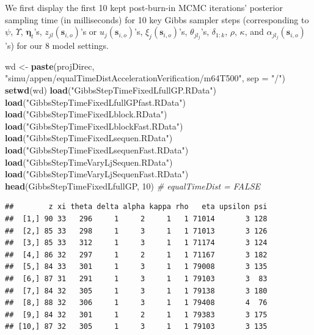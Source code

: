 \documentclass[
]{article}
\newenvironment{Shaded}{\begin{snugshade}}{\end{snugshade}}
\newcommand{\AttributeTok}[1]{\textcolor[rgb]{0.13,0.29,0.53}{#1}}
\newcommand{\CommentTok}[1]{\textcolor[rgb]{0.56,0.35,0.01}{\textit{#1}}}
\newcommand{\DecValTok}[1]{\textcolor[rgb]{0.00,0.00,0.81}{#1}}
\newcommand{\FunctionTok}[1]{\textcolor[rgb]{0.13,0.29,0.53}{\textbf{#1}}}
\newcommand{\NormalTok}[1]{#1}
\newcommand{\OtherTok}[1]{\textcolor[rgb]{0.56,0.35,0.01}{#1}}
\newcommand{\StringTok}[1]{\textcolor[rgb]{0.31,0.60,0.02}{#1}}
\begin{document}
We first display the first 10 kept post-burn-in MCMC iterations'
posterior sampling time (in milliseconds) for 10 key Gibbs sampler steps
(corresponding to \(\psi\), \(\Upsilon\), \(\bm{\eta}_t\)'s,
\(z_{jl}(\bm{s}_{i,o})\)'s or \(u_j(\bm{s}_{i,o})\)'s,
\(\xi_j(\bm{s}_{i,o})\)'s, \(\theta_{jl_j}\)'s, \(\delta_{1:k}\),
\(\rho\), \(\kappa\), and \(\alpha_{jl_j}(\bm{s}_{i,o})\)'s) for our 8
model settings.

\begin{Shaded}
\begin{Highlighting}[]
\NormalTok{wd }\OtherTok{\textless{}{-}} \FunctionTok{paste}\NormalTok{(projDirec, }\StringTok{"simu/appen/equalTimeDistAccelerationVerification/m64T500"}\NormalTok{, }\AttributeTok{sep =} \StringTok{"/"}\NormalTok{)}
\FunctionTok{setwd}\NormalTok{(wd)}
\FunctionTok{load}\NormalTok{(}\StringTok{"GibbsStepTimeFixedLfullGP.RData"}\NormalTok{)}
\FunctionTok{load}\NormalTok{(}\StringTok{"GibbsStepTimeFixedLfullGPfast.RData"}\NormalTok{)}
\FunctionTok{load}\NormalTok{(}\StringTok{"GibbsStepTimeFixedLblock.RData"}\NormalTok{)}
\FunctionTok{load}\NormalTok{(}\StringTok{"GibbsStepTimeFixedLblockFast.RData"}\NormalTok{)}
\FunctionTok{load}\NormalTok{(}\StringTok{"GibbsStepTimeFixedLsequen.RData"}\NormalTok{)}
\FunctionTok{load}\NormalTok{(}\StringTok{"GibbsStepTimeFixedLsequenFast.RData"}\NormalTok{)}
\FunctionTok{load}\NormalTok{(}\StringTok{"GibbsStepTimeVaryLjSequen.RData"}\NormalTok{)}
\FunctionTok{load}\NormalTok{(}\StringTok{"GibbsStepTimeVaryLjSequenFast.RData"}\NormalTok{)}
\FunctionTok{head}\NormalTok{(GibbsStepTimeFixedLfullGP, }\DecValTok{10}\NormalTok{)      }\CommentTok{\# equalTimeDist = FALSE}
\end{Highlighting}
\end{Shaded}

\begin{verbatim}
##        z xi theta delta alpha kappa rho   eta upsilon psi
##  [1,] 90 33   296     1     2     1   1 71014       3 128
##  [2,] 85 33   298     1     3     1   1 71013       3 126
##  [3,] 85 33   312     1     3     1   1 71174       3 124
##  [4,] 86 32   297     1     2     1   1 71167       3 182
##  [5,] 84 33   301     1     3     1   1 79008       3 135
##  [6,] 87 31   291     1     3     1   1 79103       3  83
##  [7,] 84 32   305     1     3     1   1 79138       3 180
##  [8,] 88 32   306     1     3     1   1 79408       4  76
##  [9,] 84 32   301     1     2     1   1 79383       3 175
## [10,] 87 32   305     1     3     1   1 79103       3 135
\end{verbatim}
\end{document}
